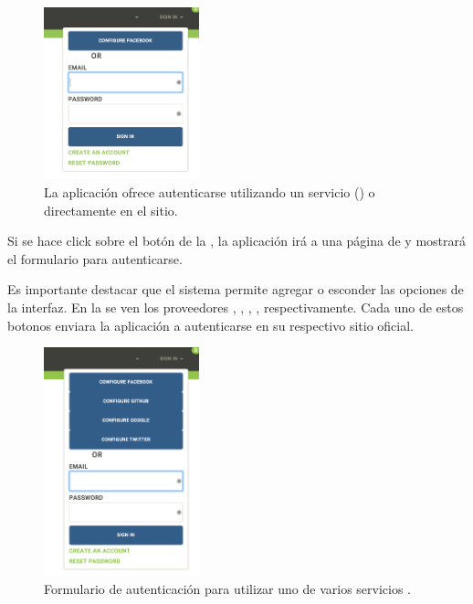 \begin{figure}[H]
	\centering
	\includegraphics[width=0.4\textwidth]{figuras/architecture/accounts/login/log_in_plus_facebook.png}

	\caption{La aplicación ofrece autenticarse utilizando un servicio \thirdParty (\facebook) o directamente en el sitio.}
	\label{figure:account:login:log_in_plus_facebook}
\end{figure}

Si se hace click sobre el botón \facebook de la , la aplicación irá a una página de \facebook y mostrará el formulario para autenticarse.

Es importante destacar que el sistema permite agregar o esconder las opciones \thirdParty de la interfaz. En la  se ven los proveedores \oauthLoginINT \facebook, \gitHubNAME, \googleNAME, \twitterNAME, respectivamente. Cada uno de estos botonos enviara la aplicación a autenticarse en su respectivo sitio oficial.

\begin{figure}[H]
	\centering
	\includegraphics[width=0.4\textwidth]{figuras/architecture/accounts/login/log_in_all_package.png}

	\caption{Formulario de autenticación para utilizar uno de varios servicios \thirdParty.}
	\label{figure:architecture:accounts:login:log_in_all_package}
\end{figure}